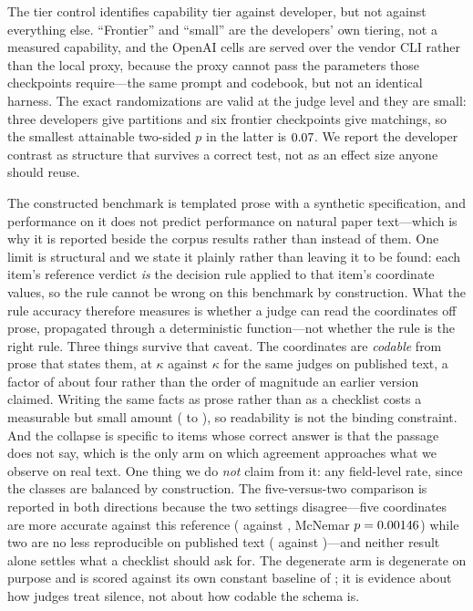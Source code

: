 \documentclass[11pt]{article}
\begin{document}
The tier control identifies capability tier against developer, but not against
everything else. ``Frontier'' and ``small'' are the developers' own tiering, not
a measured capability, and the OpenAI cells are served over the vendor CLI
rather than the local proxy, because the proxy cannot pass the parameters those
checkpoints require---the same prompt and codebook, but not an identical
harness. The exact randomizations are valid at the judge level and they are
small: three developers give \TierDevRand{} partitions and six frontier
checkpoints give \TierPairRand{} matchings, so the smallest attainable
two-sided $p$ in the latter is $0.07$. We report the developer contrast as
structure that survives a correct test, not as an effect size anyone should
reuse.

The constructed benchmark is templated prose with a synthetic specification, and
performance on it does not predict performance on natural paper text---which is
why it is reported beside the corpus results rather than instead of them. One
limit is structural and we state it plainly rather than leaving it to be found:
each item's reference verdict \emph{is} the decision rule applied to that item's
coordinate values, so the rule cannot be wrong on this benchmark by
construction. What the rule accuracy therefore measures is whether a judge can
read the coordinates off prose, propagated through a deterministic
function---not whether the rule is the right rule. Three things survive that
caveat. The coordinates are \emph{codable} from prose that states them, at
$\kappa$ \InsFullK{} against $\kappa$ \DecCoordKMax{} for the same judges on
published text, a factor of about four rather than the order of magnitude an
earlier version claimed. Writing the same facts as prose rather than as a
checklist costs a measurable but small amount (\InsCanonRule{} to
\InsNatRule{}), so readability is not the binding constraint. And the collapse
is specific to items whose correct answer is that the passage does not say,
which is the only arm on which agreement approaches what we observe on real
text. One thing we do \emph{not} claim from it: any field-level rate, since the
classes are balanced by construction. The five-versus-two comparison is reported
in both directions because the two settings disagree---five coordinates are more
accurate against this reference (\InsFiveAcc{} against \InsBestTwoAcc{},
McNemar $p=0.00146$) while two are no less reproducible on published text
(\AblCFourK{} against \AblFiveK{})---and neither result alone settles what a
checklist should ask for. The degenerate arm is degenerate on purpose and is
scored against its own constant baseline of \InsForceBase{}; it is evidence
about how judges treat silence, not about how codable the schema is.
\end{document}
